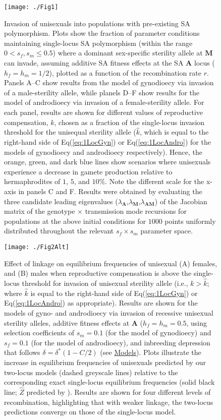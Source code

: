 \documentclass{article}
\begin{document}
\begin{figure}[htbp]
\centering
\texttt{[image: ./Fig1]}
\caption{Invasion of unisexuals into populations with pre-existing SA polymorphism. Plots show the fraction of parameter conditions maintaining single-locus SA polymorphism (within the range $0 < s_f,s_m \leq 0.5$) where a dominant sex-specific sterility allele at $\mathbf{M}$ can invade, assuming additive SA fitness effects at the SA $\mathbf{A}$ locus ($h_f=h_m=1/2$), plotted as a function of the recombination rate $r$. Panels A--C show results from the model of gynodioecy via invasion of a male-sterility allele, while planels D--F show results for the model of androdioecy via invasion of a female-sterility allele. For each panel, results are shown for different values of reproductive compensation, $k$, chosen as a fraction of the single-locus invasion threshold for the unisequal sterility allele ($\hat{k}$, which is equal to the right-hand side of Eq(\ref{eq:1LocGyn}) or Eq(\ref{eq:1LocAndro}) for the models of gynodioecy and androdioecy respectively). Hence, the orange, green, and dark blue lines show scenarios where unisexuals experience a decrease in gamete production relative to hermaphrodites of $1$, $5$, and $10\%$. Note the different scale for the x-axis in panels C and F. Results were obtained by evaluating the three candidate leading eigenvalues ($\lambda_{\mathbf{A}}$,$\lambda_{\mathbf{M}}$,$\lambda_{\mathbf{AM}}$) of the Jacobian matrix of the genotype $\times$ transmission mode recursions for populations at the above initial conditions for $1000$ points uniformly distributed throughout the relevant $s_f \times s_m$ parameter space.}
\label{fig:PrInv}
\end{figure}

\newpage{}

\begin{figure}[htbp]
\centering
\texttt{[image: ./Fig2Alt]}
\caption{Effect of linkage on equilibrium frequencies of unisexual (A) females, and (B) males when reproductive compensation is above the single-locus threshold for invasion of unisexual sterility allele (i.e., $k > \hat{k}$; where $\hat{k}$ is equal to the right-hand side of Eq(\ref{eq:1LocGyn}) or Eq(\ref{eq:1LocAndro}) as appropriate). Results are shown for the models of gyno- and androdioecy via invasion of recessive unisexual sterility alleles, additive fitness effects at $\mathbf{A}$ ($h_f = h_m = 0.5$, using selection coefficients of $s_m = 0.1$ (for the model of gynodioecy) and $s_f = 0.1$ (for the model of androdioecy), and inbreeding depression that follows $\delta = \delta^\ast(1 - C/2)$ (see \hyperref[sec:Models]{Models}). Plots illustrate the increase in equilibrium frequencies of unisexuals predicted by our two-locus models (dashed greyscale lines) relative to the corresponding exact single-locus equilibrium frequencies (solid black line; $\hat{Z}$ predicted by \citealt{Charlesworth1978a}). Results are shown for four different levels of recombination, highlighting that with weaker linkage, the two-locus predictions converge on those of the single-locus model.}
\label{fig:eqFreq2v1Loc}
\end{figure}
\newpage{}
\end{document}

